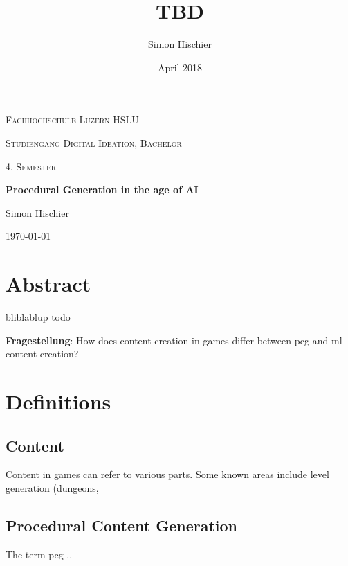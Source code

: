 \documentclass[10pt,a4paper]{article}
\title{TBD}
\author{Simon Hischier}
\date{April 2018}
\begin{document}
\begin{titlepage}
\centering
\vspace{1cm}
	{\scshape\LARGE Fachhochschule Luzern HSLU \par}
	\vspace{1cm}
	{\scshape\Large Studiengang Digital Ideation, Bachelor \par}
	
	{\scshape\Large 4. Semester\par}
	\vspace{1.5cm}
	{\huge\bf Procedural Generation in the age of AI\par}
	
	\vspace{10cm}
	{\Large Simon Hischier\par}
	\vfill

	{\large \today\par}
\end{titlepage}

\renewcommand{\contentsname}{Inhalt}
\tableofcontents
\newpage

\section{Abstract}
bliblablup todo

\textbf{Fragestellung}: How does content creation in games differ between \gls{pcg} and \gls{ml} content creation?

\section{Definitions}
\subsection{Content}
Content in games can refer to various parts. Some known areas include level generation (dungeons, 

\subsection{Procedural Content Generation}
The term \gls{pcg} ..
\end{document}
